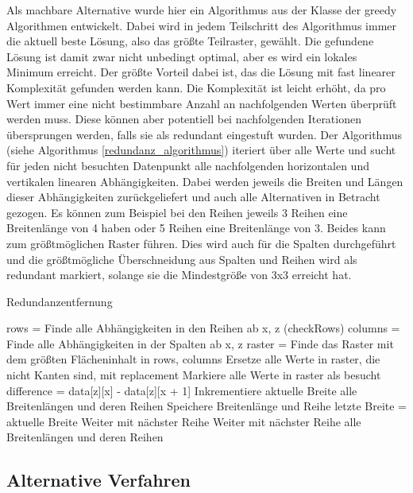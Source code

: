 Als machbare Alternative wurde hier ein Algorithmus aus der Klasse der greedy Algorithmen entwickelt. Dabei wird in jedem Teilschritt des Algorithmus immer die aktuell beste Lösung, also das größte Teilraster, gewählt. Die gefundene Lösung ist damit zwar nicht unbedingt optimal, aber es wird ein lokales Minimum erreicht. Der größte Vorteil dabei ist, das die Lösung mit fast linearer Komplexität gefunden werden kann. Die Komplexität ist leicht erhöht, da pro Wert immer eine nicht bestimmbare Anzahl an nachfolgenden Werten überprüft werden muss. Diese können aber potentiell bei nachfolgenden Iterationen übersprungen werden, falls sie als redundant eingestuft wurden. Der Algorithmus (siehe Algorithmus \ref{redundanz_algorithmus}) iteriert über alle Werte und sucht für jeden nicht besuchten Datenpunkt alle nachfolgenden horizontalen und vertikalen linearen Abhängigkeiten. Dabei werden jeweils die Breiten und Längen dieser Abhängigkeiten zurückgeliefert und auch alle Alternativen in Betracht gezogen. Es können zum Beispiel bei den Reihen jeweils 3 Reihen eine Breitenlänge von 4 haben oder 5 Reihen eine Breitenlänge von 3. Beides kann zum größtmöglichen Raster führen. Dies wird auch für die Spalten durchgeführt und die größtmögliche Überschneidung aus Spalten und Reihen wird als redundant markiert, solange sie die Mindestgröße von 3x3 erreicht hat.

\begin{algorithm}[H]
\begin{algorithmic}
\caption{Redundanzentfernung}
\label{redundanz_algorithmus}
            \State rows = Finde alle Abhängigkeiten in den Reihen ab x, z (checkRows)
            \State columns = Finde alle Abhängigkeiten in der Spalten ab x, z
            \State raster = Finde das Raster mit dem größten Flächeninhalt in rows, columns
                \State Ersetze alle Werte in raster, die nicht Kanten sind, mit replacement
                \State Markiere alle Werte in raster als besucht
            \EndIf
        \EndIf     
    \EndFor
\EndProcedure
{}
        \State difference = data[z][x] - data[z][x + 1]
                \State Inkrementiere aktuelle Breite
                \State\Return alle Breitenlängen und deren Reihen
                \State Speichere Breitenlänge und Reihe
                \State letzte Breite = aktuelle Breite
                \State Weiter mit nächster Reihe
            \Else
                \State Weiter mit nächster Reihe
            \EndIf
        \EndFor
    \EndFor
    \State\Return alle Breitenlängen und deren Reihen
\EndProcedure
\end{algorithmic}
\end{algorithm}

\subsection{Alternative Verfahren}

